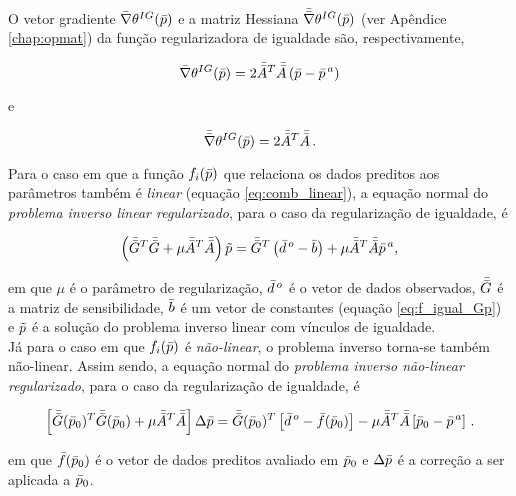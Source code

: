 \indent O vetor gradiente $\bar{\nabla}\theta^{IG}(\bar{p})$ e a matriz Hessiana
$\bar{\bar{\nabla}}\theta^{IG}(\bar{p})$ (ver Apêndice \ref{chap:opmat}) da função
regularizadora de igualdade são, respectivamente,

\begin{equation}
\bar{\nabla}\theta^{IG}(\bar{p}) = 2\bar{\bar{A}}^T\bar{\bar{A}}
    \left(\bar{p} - \bar{p}^{\thinspace a} \right)
\end{equation}

\noindent e

\begin{equation}
\bar{\bar{\nabla}}\theta^{IG}(\bar{p}) = 2\bar{\bar{A}}^T\bar{\bar{A}} \thinspace .
\end{equation}

\indent Para o caso em que a função $f_i(\bar{p})$ que relaciona
os dados preditos aos parâmetros também é {\it linear} (equação \ref{eq:comb_linear}),
a equação normal do {\it problema inverso linear regularizado},
para o caso da regularização de igualdade, é

\begin{equation}
\left(\bar{\bar{G}}^T\bar{\bar{G}} + \mu\bar{\bar{A}}^T\bar{\bar{A}}\right)\tilde{p} =
    \bar{\bar{G}}^T\left(\bar{d}^{\thinspace o} - \bar{b} \right) +
    \mu\bar{\bar{A}}^T\bar{\bar{A}}\bar{p}^{\thinspace a} ,
\end{equation}

\noindent em que $\mu$ é o parâmetro de regularização, $\bar{d}^{\thinspace o}$
é o vetor de dados observados, $\bar{\bar{G}}$ é a matriz de sensibilidade, $\bar{b}$
é um vetor de constantes (equação \ref{eq:f_igual_Gp}) e $\tilde{p}$ é a solução
do problema inverso linear com vínculos de igualdade.
\\
\indent Já para o caso em que $f_i(\bar{p})$ é {\it não-linear}, o problema
inverso torna-se também não-linear. Assim sendo, a equação normal do
{\it problema inverso não-linear regularizado}, para o caso da regularização de
igualdade, é

\begin{equation}
\left[\bar{\bar{G}}(\bar{p}_0)^T\bar{\bar{G}}(\bar{p}_0) +
      \mu\bar{\bar{A}}^T\bar{\bar{A}}\right]\Delta\bar{p} =
\bar{\bar{G}}(\bar{p}_0)^T \left[\bar{d}^{\thinspace o} - \bar{f}(\bar{p}_0)\right] -
\mu\bar{\bar{A}}^T\bar{\bar{A}}\left[\bar{p}_0 - \bar{p}^{\thinspace a}\right]
    \thinspace .
\end{equation}

\noindent em que $\bar{f}(\bar{p}_0)$ é o vetor de dados preditos avaliado em
$\bar{p}_0$ e $\Delta\bar{p}$ é a correção a ser aplicada a $\bar{p}_0$.

